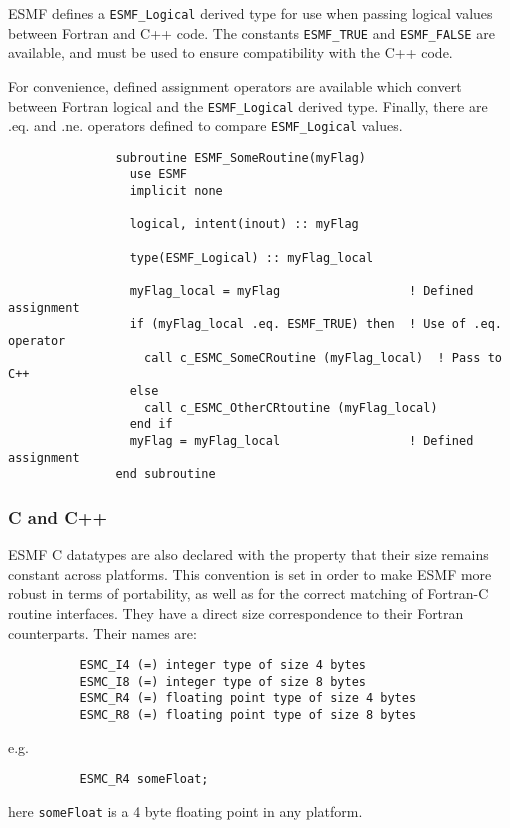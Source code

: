 ESMF defines a {\tt ESMF\_Logical} derived type for use when passing logical values between Fortran and C++ code.  The constants {\tt ESMF\_TRUE} and
{\tt ESMF\_FALSE} are available, and must be used to ensure compatibility with the C++ code.

For convenience, defined assignment operators are available which convert between Fortran logical and the {\tt ESMF\_Logical} derived type. 
Finally, there are .eq. and .ne. operators defined to compare {\tt ESMF\_Logical} values.

\begin{verbatim}
               subroutine ESMF_SomeRoutine(myFlag)
                 use ESMF
                 implicit none
		 
                 logical, intent(inout) :: myFlag
	       
                 type(ESMF_Logical) :: myFlag_local

                 myFlag_local = myFlag                  ! Defined assignment
                 if (myFlag_local .eq. ESMF_TRUE) then  ! Use of .eq. operator
                   call c_ESMC_SomeCRoutine (myFlag_local)  ! Pass to C++
                 else
                   call c_ESMC_OtherCRtoutine (myFlag_local)
                 end if
                 myFlag = myFlag_local                  ! Defined assignment
               end subroutine
\end{verbatim}


\subsubsection{C and C++}

ESMF C datatypes are also declared with the property that their size remains constant across platforms. This convention is set in order to make ESMF more robust in terms of portability, as well as for the correct matching of Fortran-C routine interfaces. They have a direct size correspondence to their Fortran counterparts. Their names are:

\begin{verbatim}   
          ESMC_I4 (=) integer type of size 4 bytes
          ESMC_I8 (=) integer type of size 8 bytes
          ESMC_R4 (=) floating point type of size 4 bytes
          ESMC_R8 (=) floating point type of size 8 bytes
\end{verbatim}

e.g.
\begin{verbatim}
          ESMC_R4 someFloat;
\end{verbatim}
here {\tt someFloat} is a 4 byte floating point in any platform.

